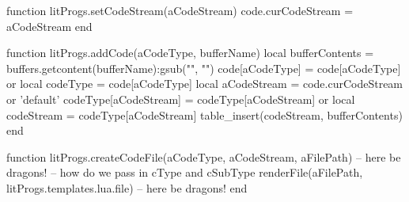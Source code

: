 \startLuaCode
function litProgs.setCodeStream(aCodeStream)
  code.curCodeStream = aCodeStream  
end

function litProgs.addCode(aCodeType, bufferName)
  local bufferContents  =
    buffers.getcontent(bufferName):gsub("", "\n")
  code[aCodeType]       = code[aCodeType] or { }
  local codeType        = code[aCodeType]
  local aCodeStream     = code.curCodeStream or 'default'
  codeType[aCodeStream] = codeType[aCodeStream] or { }
  local codeStream      = codeType[aCodeStream]
  table_insert(codeStream, bufferContents)
end

function litProgs.createCodeFile(aCodeType,
                                 aCodeStream,
                                 aFilePath)
  -- here be dragons! -- how do we pass in cType and cSubType
  renderFile(aFilePath, litProgs.templates.lua.file)
  -- here be dragons!
end
\stopLuaCode

\stopchapter